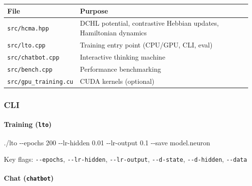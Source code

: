 \documentclass[
  11pt,
  a4paper,
]{article}
\newenvironment{Shaded}{\begin{snugshade}}{\end{snugshade}}
\newcommand{\AttributeTok}[1]{\textcolor[rgb]{0.13,0.29,0.53}{#1}}
\newcommand{\ExtensionTok}[1]{#1}
\newcommand{\NormalTok}[1]{#1}
\begin{document}
\begin{longtable}[]{@{}
  >{\raggedright\arraybackslash}p{}
  >{\raggedright\arraybackslash}p{}@{}}
\toprule\noalign{}
\begin{minipage}[b]{\linewidth}\raggedright
File
\end{minipage} & \begin{minipage}[b]{\linewidth}\raggedright
Purpose
\end{minipage} \\
\midrule\noalign{}
\endhead
\bottomrule\noalign{}
\endlastfoot
\texttt{src/hcma.hpp} & DCHL potential, contrastive Hebbian updates,
Hamiltonian dynamics \\
\texttt{src/lto.cpp} & Training entry point (CPU/GPU, CLI, eval) \\
\texttt{src/chatbot.cpp} & Interactive thinking machine \\
\texttt{src/bench.cpp} & Performance benchmarking \\
\texttt{src/gpu\_training.cu} & CUDA kernels (optional) \\
\end{longtable}

\subsubsection{CLI}\label{cli}

\paragraph{\texorpdfstring{Training
(\texttt{lto})}{Training (lto)}}\label{training-lto}

\begin{Shaded}
\begin{Highlighting}[]
\ExtensionTok{./lto} \AttributeTok{{-}{-}epochs}\NormalTok{ 200 }\AttributeTok{{-}{-}lr{-}hidden}\NormalTok{ 0.01 }\AttributeTok{{-}{-}lr{-}output}\NormalTok{ 0.1 }\AttributeTok{{-}{-}save}\NormalTok{ model.neuron}
\end{Highlighting}
\end{Shaded}

Key flags: \texttt{-\/-epochs}, \texttt{-\/-lr-hidden},
\texttt{-\/-lr-output}, \texttt{-\/-d-state}, \texttt{-\/-d-hidden},
\texttt{-\/-data}

\paragraph{\texorpdfstring{Chat
(\texttt{chatbot})}{Chat (chatbot)}}\label{chat-chatbot}
\end{document}
